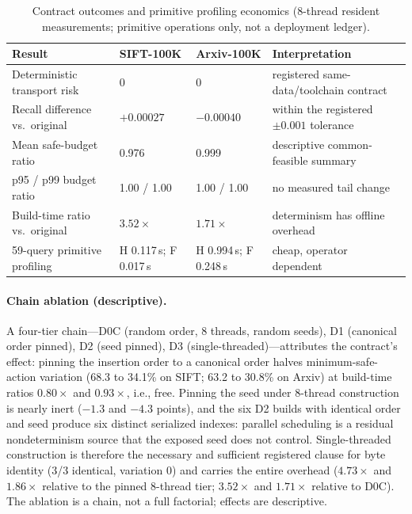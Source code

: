 \documentclass{article}
\begin{document}
\begin{table}[t]
\centering
\caption{Contract outcomes and primitive profiling economics (8-thread resident measurements; primitive
operations only, not a deployment ledger).}
\label{tab:contract}
\footnotesize
\setlength{\tabcolsep}{3.5pt}
\begin{tabular}{p{3.7cm}llp{4.2cm}}
\toprule
Result & SIFT-100K & Arxiv-100K & Interpretation \\
\midrule
Deterministic transport risk & 0 & 0 & registered same-data/toolchain contract \\
Recall difference vs.\ original & $+0.00027$ & $-0.00040$ & within the registered $\pm0.001$ tolerance \\
Mean safe-budget ratio & 0.976 & 0.999 & descriptive common-feasible summary \\
p95 / p99 budget ratio & 1.00 / 1.00 & 1.00 / 1.00 & no measured tail change \\
Build-time ratio vs.\ original & $3.52\times$ & $1.71\times$ & determinism has offline overhead \\
59-query primitive profiling & H 0.117\,s; F 0.017\,s & H 0.994\,s; F 0.248\,s & cheap, operator dependent \\
\bottomrule
\end{tabular}
\end{table}

\paragraph{Chain ablation (descriptive).}
A four-tier chain---D0C (random order, 8 threads, random seeds), D1 (canonical order pinned), D2 (seed
pinned), D3 (single-threaded)---attributes the contract's effect: pinning the insertion order to a
canonical order halves minimum-safe-action variation (68.3 to 34.1\% on SIFT; 63.2 to 30.8\% on Arxiv) at
build-time ratios $0.80\times$ and $0.93\times$, i.e., free. Pinning the seed under 8-thread construction is
nearly inert ($-1.3$ and $-4.3$ points), and the six D2 builds with identical order and seed produce six
distinct serialized indexes: parallel scheduling is a residual nondeterminism source that the exposed seed
does not control. Single-threaded construction is therefore the necessary and sufficient registered clause
for byte identity (3/3 identical, variation 0) and carries the entire overhead ($4.73\times$ and
$1.86\times$ relative to the pinned 8-thread tier; $3.52\times$ and $1.71\times$ relative to D0C). The
ablation is a chain, not a full factorial; effects are descriptive.
\end{document}
